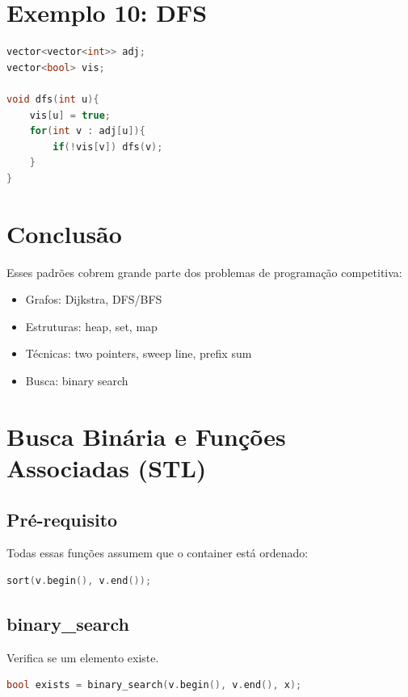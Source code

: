 \documentclass[11pt]{article}
\begin{document}
\section{Exemplo 10: DFS}

\begin{lstlisting}[language=C++]
vector<vector<int>> adj;
vector<bool> vis;

void dfs(int u){
    vis[u] = true;
    for(int v : adj[u]){
        if(!vis[v]) dfs(v);
    }
}
\end{lstlisting}

\section{Conclusão}

Esses padrões cobrem grande parte dos problemas de programação competitiva:
\begin{itemize}
    \item Grafos: Dijkstra, DFS/BFS
    \item Estruturas: heap, set, map
    \item Técnicas: two pointers, sweep line, prefix sum
    \item Busca: binary search
\end{itemize}

\section{Busca Binária e Funções Associadas (STL)}

\subsection{Pré-requisito}

Todas essas funções assumem que o container está ordenado:
\begin{lstlisting}[language=C++]
sort(v.begin(), v.end());
\end{lstlisting}

\subsection{binary\_search}

Verifica se um elemento existe.

\begin{lstlisting}[language=C++]
bool exists = binary_search(v.begin(), v.end(), x);
\end{lstlisting}
\end{document}

